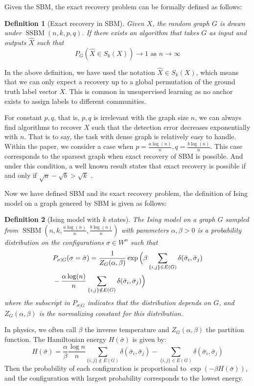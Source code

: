\documentclass[journal]{IEEEtran}
\newtheorem{definition}{Definition}
\newcommand{\A}{\frac{a \log(n)}{n}}
\newcommand{\B}{\frac{b \log(n)}{n}}
\DeclareMathOperator{\SSBM}{SSBM}
\begin{document}
Given the SBM, the exact recovery problem can be formally defined as follows:
\begin{definition}[Exact recovery in SBM] \label{def:SSBMR}
Given $X$, the random graph $G$ is drawn under $\SSBM(n,k,p,q)$. If there exists an algorithm that takes
$G$ as input and outputs $\hat{X}$ such that
\begin{equation*}
P_G(\hat{X} \in S_k(X)) \to 1 \textrm{ as } n \to \infty
\end{equation*}
\end{definition}

In the above definition, we have used the notation $\hat{X} \in S_k(X)$, which means that we can only
expect a recovery up to a global permutation of the ground truth label vector $X$. This is common in unsupervised
learning as no anchor exists to assign labels to different communities.

For constant $p,q$, that is, $p,q$ is irrelevant with the graph size $n$,
we can always find algorithms to recover $X$ such that the detection error decreases exponentially with $n$.
That is to say, the task with dense graph is relatively easy to handle. Within the paper, we consider a case
when $p = \A, q = \B$. This case corresponds to the sparsest graph when exact recovery of SBM is possible.
And under this condition, a well known result states that
exact recovery is possible if and only if $\sqrt{a} - \sqrt{b} > \sqrt{k}$ \cite{abbe2015community}.

Now we have defined SBM and its exact recovery problem, the definition of Ising model on a graph genered by SBM is given
as follows:
\begin{definition}[Ising model with $k$ states]\label{def:ising}
	The Ising model on a graph $G$ sampled from $\SSBM(n,k,\A,\B)$ with parameters $\alpha,\beta>0$ is a probability distribution on the configurations $\sigma\in W^n$ such that
	\begin{align} \label{eq:isingma}
	&P_{\sigma|G}(\sigma=\bar{\sigma})=\frac{1}{Z_G(\alpha,\beta)}
	\exp\Big(\beta \sum_{\{i,j\}\in E(G)}\delta(\bar{\sigma}_i, \bar{\sigma}_j) \notag\\
	&-\frac{\alpha\log(n)}{n} \sum_{\{i,j\}\notin E(G)} \delta(\bar{\sigma}_i, \bar{\sigma}_j)
	\Big)
	\end{align}
	where the subscript in $P_{\sigma|G}$ indicates that the distribution depends on $G$, and
	$Z_G(\alpha,\beta)$ is the normalizing constant for this distribution.
\end{definition}
In physics, we often call $\beta$ the inverse temperature and $Z_G(\alpha, \beta)$ the partition function.
The Hamiltonian energy $H(\bar{\sigma})$ is given by:
\begin{equation}
H(\bar{\sigma}) = \frac{\alpha}{\beta} \frac{\log n}{n} \sum_{\{i,j\}\not\in E(G)} \delta(\bar{\sigma}_i, \bar{\sigma}_j)
- \sum_{\{i,j\}\in E(G)} \delta(\bar{\sigma}_i, \bar{\sigma}_j)
\end{equation}
Then the probability of each configuration is proportional to $\exp(-\beta H(\bar{\sigma}))$, and the configuration with largest
probability corresponds to the lowest energy.
\end{document}
